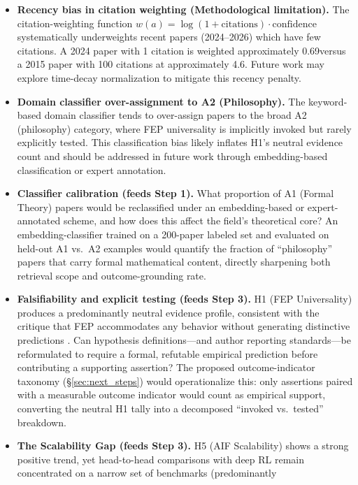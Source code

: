 \documentclass[
  english,
]{article}
\begin{document}
{{{{{{{{{{{{{{{{\begin{itemize}
\item
  \textbf{Recency bias in citation weighting (Methodological
  limitation).} The citation-weighting function
  \(w(a) = \log(1+\text{citations}) \cdot \text{confidence}\)
  systematically underweights recent papers (2024--2026) which have few
  citations. A 2024 paper with 1 citation is weighted approximately
  0.69\times versus a 2015 paper with 100 citations at approximately
  4.6\times. Future work may explore time-decay normalization to
  mitigate this recency penalty.
\item
  \textbf{Domain classifier over-assignment to A2 (Philosophy).} The
  keyword-based domain classifier tends to over-assign papers to the
  broad A2 (philosophy) category, where FEP universality is implicitly
  invoked but rarely explicitly tested. This classification bias likely
  inflates H1's neutral evidence count and should be addressed in future
  work through embedding-based classification or expert annotation.
\item
  \textbf{Classifier calibration (feeds Step 1).} What proportion of A1
  (Formal Theory) papers would be reclassified under an embedding-based
  or expert-annotated scheme, and how does this affect the field's
  theoretical core? An embedding-classifier trained on a 200-paper
  labeled set and evaluated on held-out A1 vs.~A2 examples would
  quantify the fraction of ``philosophy'' papers that carry formal
  mathematical content, directly sharpening both retrieval scope and
  outcome-grounding rate.
\item
  \textbf{Falsifiability and explicit testing (feeds Step 3).} H1 (FEP
  Universality) produces a predominantly neutral evidence profile,
  consistent with the critique that FEP accommodates any behavior
  without generating distinctive predictions \citep{colombo2021free}.
  Can hypothesis definitions---and author reporting standards---be
  reformulated to require a formal, refutable empirical prediction
  before contributing a supporting assertion? The proposed
  outcome-indicator taxonomy (§\ref{sec:next_steps}) would
  operationalize this: only assertions paired with a measurable outcome
  indicator would count as empirical support, converting the neutral H1
  tally into a decomposed ``invoked vs.~tested'' breakdown.
\item
  \textbf{The Scalability Gap (feeds Step 3).} H5 (AIF Scalability)
  shows a strong positive trend, yet head-to-head comparisons with deep
  RL remain concentrated on a narrow set of benchmarks (predominantly

\end{itemize}}}}}}}}}}}}}}}}}
\end{document}
